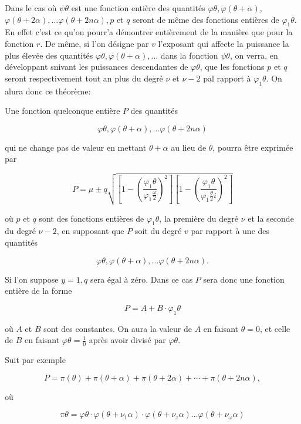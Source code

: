 \documentclass{article}
\begin{document}
Dans le cas où \(\psi \theta\) est une fonction entière des quantités \(\varphi \theta, \varphi(\theta+\alpha)\), \(\varphi(\theta+2 \alpha), \ldots \varphi(\theta+2 n \alpha), p\) et \(q\) seront de même des fonctions entières de \(\varphi_{1} \theta\). En effet c'est ce qu'on pourr'a démontrer entièrement de la manière que pour la fonction \(r\). De même, si l'on désigne par \(v\) l'exposant qui affecte la puissance la plus élevée des quantités \(\varphi \theta, \varphi(\theta+\alpha), \ldots\) dans la fonction \(\psi \theta\), on verra, en développant snivant les puissances descendantes de \(\varphi \theta\), que les fonctions \(p\) et \(q\) seront respectivement tout an plus du degré \(\nu\) et \(\nu-2\) pal rapport à \(\varphi_{1} \theta\). On alura donc ce théorème:

Une fonction quelconque entière \(P\) des quantités

\[
\varphi \theta, \varphi(\theta+\alpha), \ldots \varphi(\theta+2 n \alpha)
\]

qui ne change pas de valeur en mettant \(\theta+\alpha\) au lieu de \(\theta\), pourra être exprimée par

\[
P=\mu \pm q \sqrt{\left[1-\left(\frac{\varphi_{1} \theta}{\varphi_{1} \frac{\omega}{2}}\right)^{2}\right]\left[1-\left(\frac{\varphi_{1} \theta}{\varphi_{1} \frac{\theta}{2} i}\right)^{2}\right]}
\]

où \(p\) et \(q\) sont des fonctions entières de \(\varphi_{1} \theta\), la première du degré \(\nu\) et la seconde du degré \(\nu-2\), en supposant que \(P\) soit du degré \(v\) par rapport à une des quantités

\[
\varphi \theta, \varphi(\theta+\alpha), \ldots \varphi(\theta+2 n \alpha) .
\]

Si l'on suppose \(y=1, q\) sera égal à zéro. Dans ce cas \(P\) sera donc une fonction entière de la forme

\[
P=A+B \cdot \varphi_{1} \theta
\]

où \(A\) et \(B\) sont des constantes. On aura la valeur de \(A\) en faisant \(\theta=0\), et celle de \(B\) en faisant \(\varphi \theta=\frac{1}{0}\) après avoir divisé par \(\varphi \theta\).

Suit par exemple

\[
P=\pi(\theta)+\pi(\theta+\alpha)+\pi(\theta+2 \alpha)+\cdots+\pi(\theta+2 n \alpha),
\]

où

\[
\pi \theta=\varphi \theta \cdot \varphi\left(\theta+\nu_{1} \alpha\right) \cdot \varphi\left(\theta+\nu_{z} \alpha\right) \ldots \varphi\left(\theta+\nu_{\omega} \alpha\right)
\]
\end{document}
